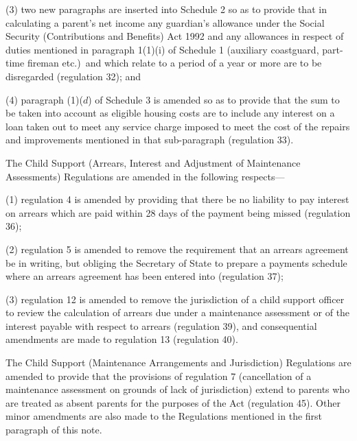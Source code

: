 \documentclass[a4paper]{article}
\begin{document}
 (3) two new paragraphs are inserted into Schedule 2 so as to provide that in calculating a parent’s net income any guardian’s allowance under the Social Security (Contributions and Benefits) Act 1992 and any allowances in respect of duties mentioned in paragraph 1(1)(i) of Schedule 1 (auxiliary coastguard, part-time fireman etc.)\ and which relate to a period of a year or more are to be disregarded (regulation 32); and

 (4) paragraph (1)($d$) of Schedule 3 is amended so as to provide that the sum to be taken into account as eligible housing costs are to include any interest on a loan taken out to meet any service charge imposed to meet the cost of the repairs and improvements mentioned in that sub-paragraph (regulation 33).

 The Child Support (Arrears, Interest and Adjustment of Maintenance Assessments) Regulations are amended in the following respects---

 (1) regulation 4 is amended by providing that there be no liability to pay interest on arrears which are paid within 28 days of the payment being missed (regulation 36);

 (2) regulation 5 is amended to remove the requirement that an arrears agreement be in writing, but obliging the Secretary of State to prepare a payments schedule where an arrears agreement has been entered into (regulation 37);

 (3) regulation 12 is amended to remove the jurisdiction of a child support officer to review the calculation of arrears due under a maintenance assessment or of the interest payable with respect to arrears (regulation 39), and consequential amendments are made to regulation 13 (regulation 40).

  The Child Support (Maintenance Arrangements and Jurisdiction) Regulations are amended to provide that the provisions of regulation 7 (cancellation of a maintenance assessment on grounds of lack of jurisdiction) extend to parents who are treated as absent parents for the purposes of the Act (regulation 45). Other minor amendments are also made to the Regulations mentioned in the first paragraph of this note.
\end{document}
